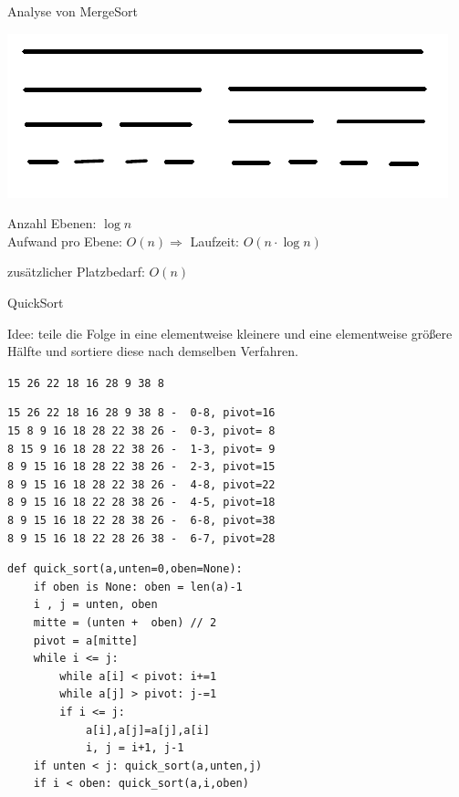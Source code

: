 \documentclass{beamer}
\begin{document}
\begin{frame}[fragile]

Analyse von MergeSort\pause

\includegraphics[scale=0.6]{mergesort1.png} 

Anzahl Ebenen: $\log n$ \\ \pause
Aufwand pro Ebene: \pause $O(n)  \Rightarrow$ Laufzeit:  \pause  $O(n \cdot \log n)$  

zusätzlicher Platzbedarf: \pause $O(n)$

\end{frame}

\begin{frame}[fragile]
QuickSort 

Idee: teile die Folge in eine elementweise kleinere und eine elementweise größere Hälfte und sortiere diese
nach demselben Verfahren. 

\texttt{15 26 22 18 16 28 9 38 8} \pause

\begin{lstlisting}
15 26 22 18 16 28 9 38 8 -  0-8, pivot=16
15 8 9 16 18 28 22 38 26 -  0-3, pivot= 8
8 15 9 16 18 28 22 38 26 -  1-3, pivot= 9
8 9 15 16 18 28 22 38 26 -  2-3, pivot=15
8 9 15 16 18 28 22 38 26 -  4-8, pivot=22
8 9 15 16 18 22 28 38 26 -  4-5, pivot=18
8 9 15 16 18 22 28 38 26 -  6-8, pivot=38
8 9 15 16 18 22 28 26 38 -  6-7, pivot=28
\end{lstlisting}

\end{frame}

\begin{frame}[fragile]
\begin{lstlisting} 
def quick_sort(a,unten=0,oben=None):
    if oben is None: oben = len(a)-1
    i , j = unten, oben
    mitte = (unten +  oben) // 2
    pivot = a[mitte]
    while i <= j:
        while a[i] < pivot: i+=1
        while a[j] > pivot: j-=1
        if i <= j:
            a[i],a[j]=a[j],a[i]
            i, j = i+1, j-1
    if unten < j: quick_sort(a,unten,j)
    if i < oben: quick_sort(a,i,oben)
\end{lstlisting} 
\end{frame}
\end{document}
